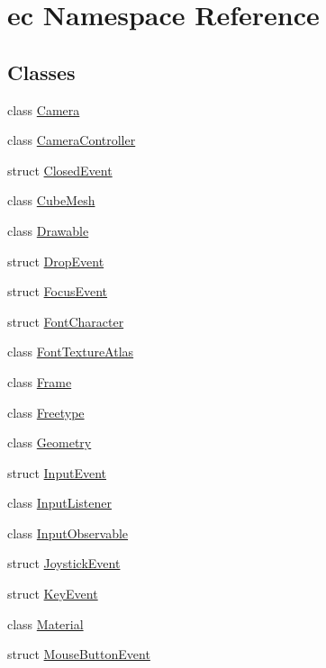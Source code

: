\hypertarget{namespaceec}{}\section{ec Namespace Reference}
\label{namespaceec}
\subsection*{Classes}
\begin{DoxyCompactItemize}
\item 
class \mbox{\hyperlink{classec_1_1_camera}{Camera}}
\item 
class \mbox{\hyperlink{classec_1_1_camera_controller}{Camera\+Controller}}
\item 
struct \mbox{\hyperlink{structec_1_1_closed_event}{Closed\+Event}}
\item 
class \mbox{\hyperlink{classec_1_1_cube_mesh}{Cube\+Mesh}}
\item 
class \mbox{\hyperlink{classec_1_1_drawable}{Drawable}}
\item 
struct \mbox{\hyperlink{structec_1_1_drop_event}{Drop\+Event}}
\item 
struct \mbox{\hyperlink{structec_1_1_focus_event}{Focus\+Event}}
\item 
struct \mbox{\hyperlink{structec_1_1_font_character}{Font\+Character}}
\item 
class \mbox{\hyperlink{classec_1_1_font_texture_atlas}{Font\+Texture\+Atlas}}
\item 
class \mbox{\hyperlink{classec_1_1_frame}{Frame}}
\item 
class \mbox{\hyperlink{classec_1_1_freetype}{Freetype}}
\item 
class \mbox{\hyperlink{classec_1_1_geometry}{Geometry}}
\item 
struct \mbox{\hyperlink{structec_1_1_input_event}{Input\+Event}}
\item 
class \mbox{\hyperlink{classec_1_1_input_listener}{Input\+Listener}}
\item 
class \mbox{\hyperlink{classec_1_1_input_observable}{Input\+Observable}}
\item 
struct \mbox{\hyperlink{structec_1_1_joystick_event}{Joystick\+Event}}
\item 
struct \mbox{\hyperlink{structec_1_1_key_event}{Key\+Event}}
\item 
class \mbox{\hyperlink{classec_1_1_material}{Material}}
\item 
struct \mbox{\hyperlink{structec_1_1_mouse_button_event}{Mouse\+Button\+Event}}

\end{DoxyCompactItemize}
